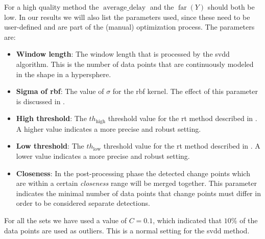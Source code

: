 For a high quality method the $\operatorname*{average\_delay}$ and the $\operatorname*{far}(Y)$ should both be low.
In our results we will also list the parameters used, since these need to be user-defined and are part of the (manual) optimization process.
The parameters are:
\begin{itemize}
  \item \textbf{Window length}: The window length that is processed by the \gls{svdd} algorithm. This is the number of data points that are continuously modeled in the shape in a hypersphere.
  \item \textbf{Sigma of \gls{rbf}}: The value of $\sigma$ for the \gls{rbf} kernel. The effect of this parameter is discussed in .
  \item \textbf{High threshold}: The $th_\text{high}$ threshold value for the \gls{rt} method described in . A higher value indicates a more precise and robust setting.
  \item \textbf{Low threshold}: The $th_\text{low}$ threshold value for the \gls{rt} method described in . A lower value indicates a more precise and robust setting.
  \item \textbf{Closeness}: In the post-processing phase the detected change points which are within a certain \emph{closeness} range will be merged together. This parameter indicates the minimal number of data points that change points must differ in order to be considered separate detections.
\end{itemize}
For all the sets we have used a value of $C = 0.1$, which indicated that $10\%$ of the data points are used as outliers.
This is a normal setting for the \gls{svdd} method.